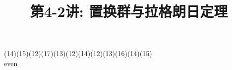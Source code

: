 \documentclass[a4paper, justified]{tufte-handout}
\title{第4-2讲: 置换群与拉格朗日定理}
\date{\zhtoday} %
\begin{document}
\maketitle
\noplagiarism %
\begin{abstract}
\end{abstract}
\beginrequired

\begin{problem}[TJ 5-3(d)]
\end{problem}

\begin{solution}
	(14)(15)(12)(17)(13)(12)(14)(12)(13)(16)(14)(15)\\
	even
\end{solution}

\begin{problem}
\end{problem}
\end{document}
